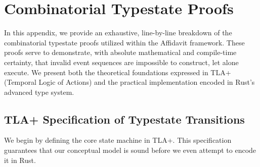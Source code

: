 \chapter{Combinatorial Typestate Proofs}
\label{app:typestate}

In this appendix, we provide an exhaustive, line-by-line breakdown of the combinatorial typestate proofs utilized within the Affidavit framework. These proofs serve to demonstrate, with absolute mathematical and compile-time certainty, that invalid event sequences are impossible to construct, let alone execute. We present both the theoretical foundations expressed in TLA+ (Temporal Logic of Actions) and the practical implementation encoded in Rust's advanced type system.

\section{TLA+ Specification of Typestate Transitions}

We begin by defining the core state machine in TLA+. This specification guarantees that our conceptual model is sound before we even attempt to encode it in Rust.

